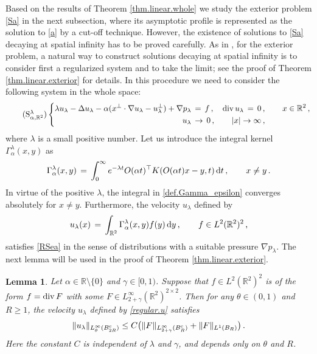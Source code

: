 \documentclass[11pt,a4paper]{article}
\newtheorem{lemma}[theorem]{Lemma}
\newcommand{\R}{\mathbb{R}}
\newcommand{\dd}{\,{\rm d}}
\begin{document}
Based on the results of Theorem \ref{thm.linear.whole} we study the exterior problem \eqref{Sa} in the next subsection, where its asymptotic profile is represented as the solution to \eqref{a} by a cut-off technique. However, the existence of solutions to \eqref{Sa} decaying at spatial infinity has to be proved carefully. As in \cite{H3}, for the exterior problem, a natural way to construct solutions decaying at spatial infinity is to consider first a regularized system and to take the limit; see the proof of Theorem \ref{thm.linear.exterior} for details. In this procedure we need to consider the following system in the whole space:
%
\begin{equation}\tag{S$^{\lambda}_{\alpha,\R^2}$}\label{RSea}
  \left\{\begin{aligned}
 \lambda u_{\lambda} - \Delta u_{\lambda}  - \alpha ( x^\bot \cdot \nabla u_{\lambda} - u_{\lambda}^\bot ) + \nabla p_{\lambda} &\,=\, f \,,  ~~~  {\rm div}\, u_{\lambda} \,=\, 0\,, ~~~~~~ x \in \R^2\,, \\
 u_{\lambda}  & \, \rightarrow \,     0   \,,  ~~~~~~ |x| \rightarrow \infty\,, 
\end{aligned}\right.
\end{equation}
%
where $\lambda$ is a small positive number. Let us introduce the integral kernel $\Gamma_{\alpha}^{\lambda}(x,y)$ as 
%
\begin{equation}\label{def.Gamma_epsilon}
\Gamma_{\alpha}^{\lambda}(x,y)
\, =\, \int_{0}^{\infty} e^{-\lambda t} O(\alpha t)^{\top}K(O(\alpha t)x-y,t) \dd t\,,~~~~~~ x\ne y\,.
\end{equation}
%
In virtue of the positive $\lambda$, the integral in \eqref{def.Gamma_epsilon} converges absolutely for $x\ne y$. Furthermore,  the velocity $u_\lambda$ defined by
%
\begin{align}
u_\lambda (x) \, = \, \int_{\R^2} \Gamma_{\alpha}^{\lambda}(x,y) f(y) \dd y\,, \qquad 
f \in L^2 (\R^2)^2\,, 
\label{regular.u}
\end{align}
%
satisfies \eqref{RSea} in the sense of distributions with a suitable pressure $\nabla p_\lambda$. 
The next lemma will be used in the proof of Theorem \ref{thm.linear.exterior}.

\begin{lemma}\label{lem.thm.linear.exterior.1}
Let $ \alpha \in \R \setminus \{0\}$ and $\gamma \in [0,1)$.
Suppose that $f \in L^2 (\R^2)^2$ is of the form $f = {\rm div}\,F$
with some $F\in L^\infty_{2+\gamma} (\R^2)^{2\times 2}$. 
Then for any $\theta \in (0,1)$ and $R\ge1$, the velocity $u_\lambda$ defined by \eqref{regular.u} satisfies 
%
\begin{equation}\label{est.lem.thm.linear.exterior.1.1}
\| u_{\lambda} \|_{L^{\infty}_{\theta}(B^{{\rm c}}_{2R})}
\leq C 
\big( \|F\|_{L^{\infty}_{2+\gamma}(B^{{\rm c}}_{R})} + \| F \|_{L^1 (B_{R})} \big) \,.
\end{equation}
%
Here the constant $C$ is independent of $\lambda$ and $\gamma$, and depends only on $\theta$ and $R$.
\end{lemma}
\end{document}
